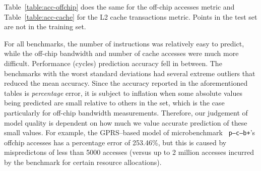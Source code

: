 Table~\ref{table:acc-offchip} does the same for the off-chip accesses metric and Table~\ref{table:acc-cache} for the L2 cache transactions metric.  Points in the test set are not in the training set.


For all benchmarks, the number of instructions was relatively easy to predict, while the off-chip bandwidth and number of cache accesses were much more difficult.  Performance (cycles) prediction accuracy fell in between.  The benchmarks with the worst standard deviations had several extreme outliers that reduced the mean accuracy. Since the accuracy reported in the aforementioned tables is {\em percentage} error, it is subject to inflation when some absolute values being predicted are small relative to others in the set, which is the case particularly for off-chip bandwidth measurements.  Therefore, our judgement of model quality is dependent on how much we value accurate prediction of these small values.  For example, the GPRS--based model of microbenchmark \texttt{  p--c--b+}'s offchip accesses has a percentage error of 253.46\%, but this is caused by mispredictons of less than 5000 accesses (versus up to 2 million accesses incurred by the benchmark for certain resource allocations).
